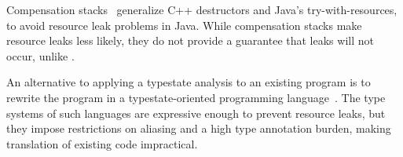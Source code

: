 Compensation stacks~\cite{WeimerN04} generalize C++ destructors and Java's
try-with-resources, to avoid resource leak problems in Java.  While
compensation stacks make resource leaks less likely, they do not provide a
guarantee that leaks will not occur, unlike \Tool.

An alternative to applying a typestate analysis to an existing program
is to rewrite the program in a typestate-oriented programming
language~\cite{AldrichSSS2009,garcia2014typestate}.  The type systems of such
languages are expressive enough to prevent resource leaks, but they impose
restrictions on aliasing and a high type annotation burden, making translation
of existing code impractical.






